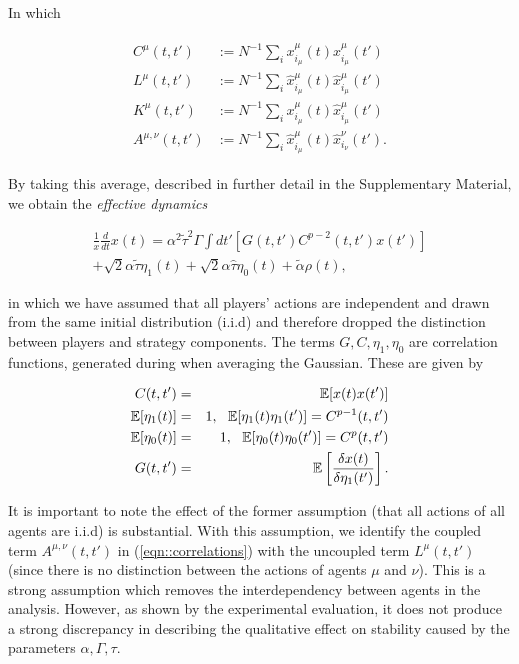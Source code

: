 \documentclass[sigconf]{aamas}
\newcommand{\xmu}[2]{x_{#1_#2}^{#2}(t)}
\newcommand{\xmudash}[2]{x_{#1_#2}^{#2}(t')}
\newcommand{\hxmu}[1]{\hat{x}_{#1_\mu}^{\mu} (t)}
\newcommand{\hxmudash}[1]{\hat{x}_{#1_\mu}^{\mu} (t')}
\newcommand{\hxnudash}[1]{\hat{x}_{#1_\nu}^{\nu} (t')}
\newcommand{\talpha}{\tilde{\alpha}}
\newcommand{\ttau}{\tilde{\tau}}
\newcommand{\htau}{\hat{\tau}}
\begin{document}
In which

\begin{align}
\label{eqn::correlations}
    \begin{split}
        C^\mu (t, t') & :=  N^{-1} \sum_i \xmu{i}{\mu} \xmudash{i}{\mu} \\
        L^\mu (t, t') & :=  N^{-1} \sum_i \hxmu{i} \hxmudash{i} \\
        K^\mu (t, t') & :=  N^{-1} \sum_i \xmu{i}{\mu} \hxmudash{i} \\
        A^{\mu, \nu} (t, t') & :=  N^{-1} \sum_i \hxmu{i} \hxnudash{i}.
    \end{split}
\end{align}

By taking this average, described in further detail in the Supplementary Material, we obtain the \textit{effective dynamics}

\begin{equation}
    \label{eqn::EffectiveDynamics}
    \begin{split}
            \frac{1}{x} \frac{d}{dt} x(t) = \alpha^2 \ttau^2 \Gamma \int dt' \left [G(t, t')C^{p - 2}(t, t') x(t') \right ]\\ + \sqrt{2} \alpha \ttau \eta_1(t) + \sqrt{2} \alpha \htau \eta_0(t) + \talpha \rho(t), 
    \end{split}
\end{equation}

in which we have assumed that all players' actions are independent and drawn from the same initial distribution (i.i.d)
and therefore dropped the distinction between players and strategy components. The terms $G, C, \eta_1, \eta_0$ are correlation functions, generated during when averaging the Gaussian. These are given by 

\begin{eqnarray*}
        C(t, t') & = & \mathbb{E}[x(t) x(t')] \\
        \mathbb{E}[\eta_1(t)] & = & 1, \text{ \space } \mathbb{E}[\eta_1(t) \eta_1(t')]  =  C^{p-1}(t, t') \\
        \mathbb{E}[\eta_0(t)] & = & 1, \text{ \space } \mathbb{E}[\eta_0(t) \eta_0(t')] = C^{p}(t, t') \\
        G(t, t') & = & \mathbb{E}\left [ \frac{\delta x(t)}{ \delta \eta_1(t')} \right].
\end{eqnarray*}

It is important to note the effect of the former assumption (that all actions of all agents are i.i.d) is substantial. With this assumption, we identify the coupled term $A^{\mu, \nu} (t, t')$ in (\ref{eqn::correlations}) with the uncoupled term $L^\mu (t, t')$ (since there is no distinction between the actions of agents $\mu$ and $\nu$). This is a strong assumption which removes the interdependency between agents in the analysis. However, as shown by the experimental evaluation, it does not produce a strong discrepancy in describing the qualitative effect on stability caused by the parameters $\alpha, \Gamma, \tau$.
\end{document}
